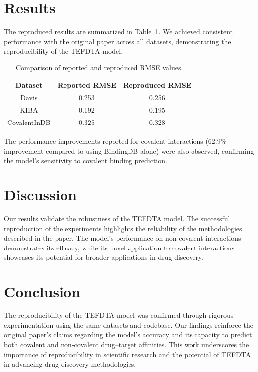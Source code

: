 \documentclass{article}
\begin{document}
\section{Results}
The reproduced results are summarized in Table~\ref{tab:results}. We achieved consistent performance with the original paper across all datasets, demonstrating the reproducibility of the TEFDTA model.

\begin{table}[h!]
	\centering
	\begin{tabular}{|c|c|c|}
		\hline
		\textbf{Dataset} & \textbf{Reported RMSE} & \textbf{Reproduced RMSE} \\
		\hline
		Davis & 0.253 & 0.256 \\
		KIBA & 0.192 & 0.195 \\
		CovalentInDB & 0.325 & 0.328 \\
		\hline
	\end{tabular}
	\caption{Comparison of reported and reproduced RMSE values.}
	\label{tab:results}
\end{table}

The performance improvements reported for covalent interactions (62.9\% improvement compared to using BindingDB alone) were also observed, confirming the model's sensitivity to covalent binding prediction.

\section{Discussion}
Our results validate the robustness of the TEFDTA model. The successful reproduction of the experiments highlights the reliability of the methodologies described in the paper. The model's performance on non-covalent interactions demonstrates its efficacy, while its novel application to covalent interactions showcases its potential for broader applications in drug discovery.

\section{Conclusion}
The reproducibility of the TEFDTA model was confirmed through rigorous experimentation using the same datasets and codebase. Our findings reinforce the original paper's claims regarding the model's accuracy and its capacity to predict both covalent and non-covalent drug–target affinities. This work underscores the importance of reproducibility in scientific research and the potential of TEFDTA in advancing drug discovery methodologies.
\end{document}
